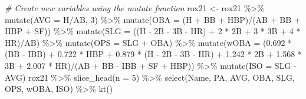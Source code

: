 \documentclass[
  11pt,
]{book}
\newenvironment{Shaded}{\begin{snugshade}}{\end{snugshade}}
\newcommand{\AttributeTok}[1]{\textcolor[rgb]{0.77,0.63,0.00}{#1}}
\newcommand{\CommentTok}[1]{\textcolor[rgb]{0.56,0.35,0.01}{\textit{#1}}}
\newcommand{\DecValTok}[1]{\textcolor[rgb]{0.00,0.00,0.81}{#1}}
\newcommand{\FloatTok}[1]{\textcolor[rgb]{0.00,0.00,0.81}{#1}}
\newcommand{\FunctionTok}[1]{\textcolor[rgb]{0.00,0.00,0.00}{#1}}
\newcommand{\NormalTok}[1]{#1}
\newcommand{\OtherTok}[1]{\textcolor[rgb]{0.56,0.35,0.01}{#1}}
\newcommand{\SpecialCharTok}[1]{\textcolor[rgb]{0.00,0.00,0.00}{#1}}
\newcommand{\StringTok}[1]{\textcolor[rgb]{0.31,0.60,0.02}{#1}}
\theoremstyle{definition}
\theoremstyle{definition}
\theoremstyle{definition}
\theoremstyle{definition}
\theoremstyle{remark}
\begin{document}
\begin{Shaded}
\begin{Highlighting}[]
\CommentTok{\# Create new variables using the mutate function}
\NormalTok{rox21 }\OtherTok{\textless{}{-}}\NormalTok{ rox21 }\SpecialCharTok{\%\textgreater{}\%}
    \FunctionTok{mutate}\NormalTok{(}\AttributeTok{AVG =}\NormalTok{ H}\SpecialCharTok{/}\NormalTok{AB, }\DecValTok{3}\NormalTok{) }\SpecialCharTok{\%\textgreater{}\%}
    \FunctionTok{mutate}\NormalTok{(}\AttributeTok{OBA =}\NormalTok{ (H }\SpecialCharTok{+}\NormalTok{ BB }\SpecialCharTok{+}\NormalTok{ HBP)}\SpecialCharTok{/}\NormalTok{(AB }\SpecialCharTok{+}\NormalTok{ BB }\SpecialCharTok{+}\NormalTok{ HBP }\SpecialCharTok{+}\NormalTok{ SF)) }\SpecialCharTok{\%\textgreater{}\%}
    \FunctionTok{mutate}\NormalTok{(}\AttributeTok{SLG =}\NormalTok{ ((H }\SpecialCharTok{{-}} \StringTok{\textasciigrave{}}\AttributeTok{2B}\StringTok{\textasciigrave{}} \SpecialCharTok{{-}} \StringTok{\textasciigrave{}}\AttributeTok{3B}\StringTok{\textasciigrave{}} \SpecialCharTok{{-}}\NormalTok{ HR) }\SpecialCharTok{+} \DecValTok{2} \SpecialCharTok{*} \StringTok{\textasciigrave{}}\AttributeTok{2B}\StringTok{\textasciigrave{}} \SpecialCharTok{+} \DecValTok{3} \SpecialCharTok{*} \StringTok{\textasciigrave{}}\AttributeTok{3B}\StringTok{\textasciigrave{}} \SpecialCharTok{+} \DecValTok{4} \SpecialCharTok{*}\NormalTok{ HR)}\SpecialCharTok{/}\NormalTok{AB) }\SpecialCharTok{\%\textgreater{}\%}
    \FunctionTok{mutate}\NormalTok{(}\AttributeTok{OPS =}\NormalTok{ SLG }\SpecialCharTok{+}\NormalTok{ OBA) }\SpecialCharTok{\%\textgreater{}\%}
    \FunctionTok{mutate}\NormalTok{(}\AttributeTok{wOBA =}\NormalTok{ (}\FloatTok{0.692} \SpecialCharTok{*}\NormalTok{ (BB }\SpecialCharTok{{-}}\NormalTok{ IBB) }\SpecialCharTok{+} \FloatTok{0.722} \SpecialCharTok{*}\NormalTok{ HBP }\SpecialCharTok{+} \FloatTok{0.879} \SpecialCharTok{*}\NormalTok{ (H }\SpecialCharTok{{-}} \StringTok{\textasciigrave{}}\AttributeTok{2B}\StringTok{\textasciigrave{}} \SpecialCharTok{{-}} \StringTok{\textasciigrave{}}\AttributeTok{3B}\StringTok{\textasciigrave{}} \SpecialCharTok{{-}}
\NormalTok{        HR) }\SpecialCharTok{+} \FloatTok{1.242} \SpecialCharTok{*} \StringTok{\textasciigrave{}}\AttributeTok{2B}\StringTok{\textasciigrave{}} \SpecialCharTok{+} \FloatTok{1.568} \SpecialCharTok{*} \StringTok{\textasciigrave{}}\AttributeTok{3B}\StringTok{\textasciigrave{}} \SpecialCharTok{+} \FloatTok{2.007} \SpecialCharTok{*}\NormalTok{ HR)}\SpecialCharTok{/}\NormalTok{(AB }\SpecialCharTok{+}\NormalTok{ BB }\SpecialCharTok{{-}}\NormalTok{ IBB }\SpecialCharTok{+}\NormalTok{ SF }\SpecialCharTok{+}\NormalTok{ HBP)) }\SpecialCharTok{\%\textgreater{}\%}
    \FunctionTok{mutate}\NormalTok{(}\AttributeTok{ISO =}\NormalTok{ SLG }\SpecialCharTok{{-}}\NormalTok{ AVG)}
\NormalTok{rox21 }\SpecialCharTok{\%\textgreater{}\%}
    \FunctionTok{slice\_head}\NormalTok{(}\AttributeTok{n =} \DecValTok{5}\NormalTok{) }\SpecialCharTok{\%\textgreater{}\%}
    \FunctionTok{select}\NormalTok{(Name, PA, AVG, OBA, SLG, OPS, wOBA, ISO) }\SpecialCharTok{\%\textgreater{}\%}
    \FunctionTok{kt}\NormalTok{()}
\end{Highlighting}
\end{Shaded}
\end{document}
